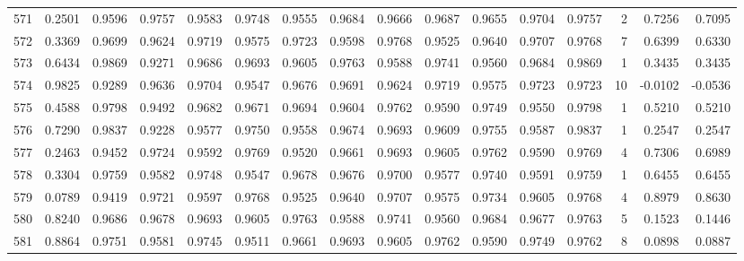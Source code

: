 \begin{tabular}{lrrrrrrrrrrrrrrr}
571 &      0.2501 &  0.9596 &  0.9757 &  0.9583 &  0.9748 &  0.9555 &  0.9684 &  0.9666 &  0.9687 &  0.9655 &   0.9704 &     0.9757 &      2 &                    0.7256 &                     0.7095 \\
572 &      0.3369 &  0.9699 &  0.9624 &  0.9719 &  0.9575 &  0.9723 &  0.9598 &  0.9768 &  0.9525 &  0.9640 &   0.9707 &     0.9768 &      7 &                    0.6399 &                     0.6330 \\
573 &      0.6434 &  0.9869 &  0.9271 &  0.9686 &  0.9693 &  0.9605 &  0.9763 &  0.9588 &  0.9741 &  0.9560 &   0.9684 &     0.9869 &      1 &                    0.3435 &                     0.3435 \\
574 &      0.9825 &  0.9289 &  0.9636 &  0.9704 &  0.9547 &  0.9676 &  0.9691 &  0.9624 &  0.9719 &  0.9575 &   0.9723 &     0.9723 &     10 &                   -0.0102 &                    -0.0536 \\
575 &      0.4588 &  0.9798 &  0.9492 &  0.9682 &  0.9671 &  0.9694 &  0.9604 &  0.9762 &  0.9590 &  0.9749 &   0.9550 &     0.9798 &      1 &                    0.5210 &                     0.5210 \\
576 &      0.7290 &  0.9837 &  0.9228 &  0.9577 &  0.9750 &  0.9558 &  0.9674 &  0.9693 &  0.9609 &  0.9755 &   0.9587 &     0.9837 &      1 &                    0.2547 &                     0.2547 \\
577 &      0.2463 &  0.9452 &  0.9724 &  0.9592 &  0.9769 &  0.9520 &  0.9661 &  0.9693 &  0.9605 &  0.9762 &   0.9590 &     0.9769 &      4 &                    0.7306 &                     0.6989 \\
578 &      0.3304 &  0.9759 &  0.9582 &  0.9748 &  0.9547 &  0.9678 &  0.9676 &  0.9700 &  0.9577 &  0.9740 &   0.9591 &     0.9759 &      1 &                    0.6455 &                     0.6455 \\
579 &      0.0789 &  0.9419 &  0.9721 &  0.9597 &  0.9768 &  0.9525 &  0.9640 &  0.9707 &  0.9575 &  0.9734 &   0.9605 &     0.9768 &      4 &                    0.8979 &                     0.8630 \\
580 &      0.8240 &  0.9686 &  0.9678 &  0.9693 &  0.9605 &  0.9763 &  0.9588 &  0.9741 &  0.9560 &  0.9684 &   0.9677 &     0.9763 &      5 &                    0.1523 &                     0.1446 \\
581 &      0.8864 &  0.9751 &  0.9581 &  0.9745 &  0.9511 &  0.9661 &  0.9693 &  0.9605 &  0.9762 &  0.9590 &   0.9749 &     0.9762 &      8 &                    0.0898 &                     0.0887 \\

\end{tabular}
